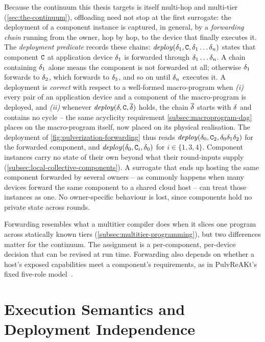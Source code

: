 Because the continuum this thesis targets is itself multi-hop and multi-tier (\cref{sec:the-continuum}),
offloading need not stop at the first surrogate:
the deployment of a component instance is captured, in general, by a \emph{forwarding chain} running from the owner,
hop by hop,
to the device that finally executes it.
%
The \emph{deployment predicate} records these chains:
$\mathit{deploy}(\delta_1, \mathtt{C}, \delta_1\dots\delta_n)$ states that component $\mathtt{C}$ at application device $\delta_1$ is forwarded through $\delta_1\dots\delta_n$.
%
A chain containing $\delta_1$ alone means the component is not forwarded at all;
otherwise $\delta_1$ forwards to $\delta_2$, which forwards to $\delta_3$, and so on until $\delta_n$ executes it.
%
A deployment is \emph{correct} with respect to a well-formed macro-program when
\emph{(i)} every pair of an application device and a component of the macro-program is deployed,
and \emph{(ii)} whenever $\mathit{deploy}(\delta, \mathtt{C}, \overline{\delta})$ holds,
the chain $\overline{\delta}$ starts with $\delta$ and contains no cycle --
the same acyclicity requirement \cref{subsec:macroprogram-dag} places on the macro-program itself,
now placed on its physical realisation.
%
The deployment of \cref{fig:pulverization-forwarding} thus reads $\mathit{deploy}(\delta_0, \mathtt{C}_2, \delta_0\delta_1\delta_2)$ for the forwarded component,
and $\mathit{deploy}(\delta_0, \mathtt{C}_i, \delta_0)$ for $i \in \{1,3,4\}$.
%
Component instances carry no state of their own beyond what their round-inputs supply (\cref{subsec:local-collective-components}).
%
A surrogate that ends up hosting the same component forwarded by several owners -- as commonly happens when many devices forward the same component to a shared cloud host -- can treat those instances as one.
%
No owner-specific behaviour is lost, since components hold no private state across rounds.

Forwarding resembles what a multitier compiler does when it slices one program across statically known tiers (\cref{subsec:multitier-programming}),
but two differences matter for the continuum.
The assignment is a per-component, per-device decision that can be revised at run time.
Forwarding also depends on whether a host's exposed capabilities meet a component's requirements,
as in PulvReAKt's fixed five-role model~\cite{DBLP:journals/fgcs/FarabegoliPCV24}.

\section{Execution Semantics and Deployment Independence}
\label{sec:pulverization-semantics}

